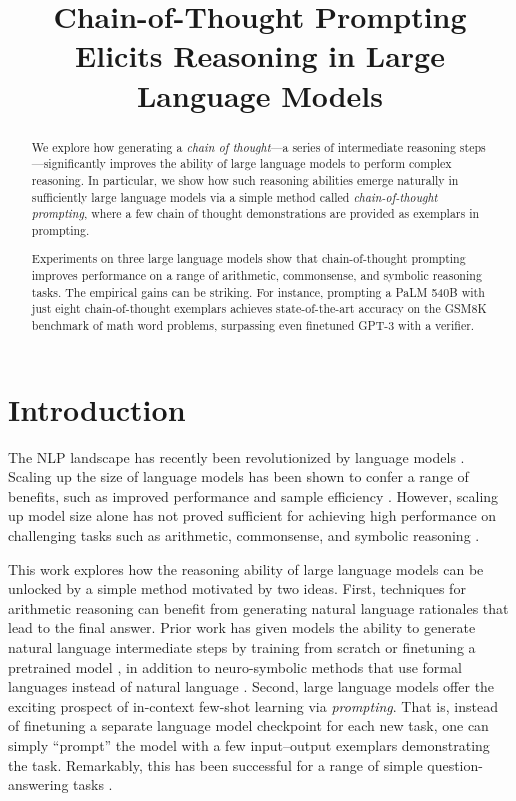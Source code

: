 \title{Chain-of-Thought Prompting Elicits Reasoning in Large Language Models}

\begin{abstract}
We explore how generating a \textit{chain of thought}---a series of intermediate reasoning steps---significantly improves the ability of large language models to perform complex reasoning. In particular, we show how such reasoning abilities emerge naturally in sufficiently large language models via a simple method called \textit{chain-of-thought prompting}, where a few chain of thought demonstrations are provided as exemplars in prompting.

Experiments on three large language models show that chain-of-thought prompting improves performance on a range of arithmetic, commonsense, and symbolic reasoning tasks. The empirical gains can be striking. For instance, prompting a PaLM 540B with just eight chain-of-thought exemplars achieves state-of-the-art accuracy on the GSM8K benchmark of math word problems, surpassing even finetuned GPT-3 with a verifier.
\end{abstract}

\section{Introduction}
The NLP landscape has recently been revolutionized by language models \citep[][\textit{inter alia}]{peters-etal-2018-deep,devlin-etal-2019-bert,brown2020language}. Scaling up the size of language models has been shown to confer a range of benefits, such as improved performance and sample efficiency  \citep[\textit{inter alia}]{kaplan2020scaling,brown2020language}. However, scaling up model size alone has not proved sufficient for achieving high performance on challenging tasks such as arithmetic, commonsense, and symbolic reasoning \citep{rae2021scaling}.

This work explores how the reasoning ability of large language models can be unlocked by a simple method motivated by two ideas. First, techniques for arithmetic reasoning can benefit from generating natural language rationales that lead to the final answer. Prior work has given models the ability to generate natural language intermediate steps by training from scratch \citep{ling-etal-2017-program} or finetuning a pretrained model \citep{cobbe2021training}, in addition to neuro-symbolic methods that use formal languages instead of natural language \citep{roy-roth-2015-solving, chiang-chen-2019-semantically,amini-etal-2019-mathqa, chen2019neural}. Second, large language models offer the exciting prospect of in-context few-shot learning via \emph{prompting}.
That is, instead of finetuning a separate language model checkpoint for each new task, one can simply ``prompt'' the model with a few input--output exemplars demonstrating the task. Remarkably, this has been successful for a range of simple question-answering tasks \citep{brown2020language}.

